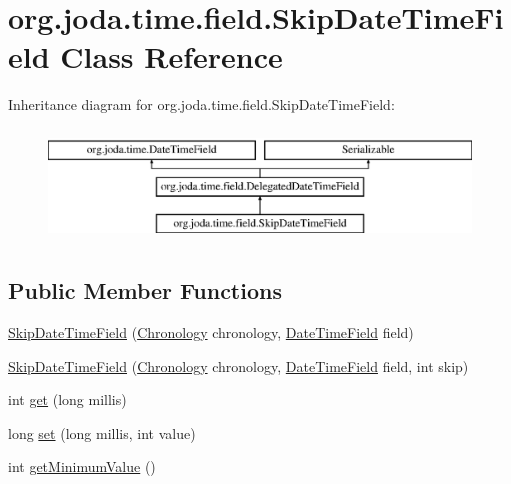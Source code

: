\hypertarget{classorg_1_1joda_1_1time_1_1field_1_1_skip_date_time_field}{\section{org.\-joda.\-time.\-field.\-Skip\-Date\-Time\-Field Class Reference}
\label{classorg_1_1joda_1_1time_1_1field_1_1_skip_date_time_field}
}
Inheritance diagram for org.\-joda.\-time.\-field.\-Skip\-Date\-Time\-Field\-:\begin{figure}[H]
\begin{center}
\leavevmode
\includegraphics[height=3.000000cm]{classorg_1_1joda_1_1time_1_1field_1_1_skip_date_time_field}
\end{center}
\end{figure}
\subsection*{Public Member Functions}
\begin{DoxyCompactItemize}
\item 
\hyperlink{classorg_1_1joda_1_1time_1_1field_1_1_skip_date_time_field_aa9891dcbec47c62f7083570c03f04257}{Skip\-Date\-Time\-Field} (\hyperlink{classorg_1_1joda_1_1time_1_1_chronology}{Chronology} chronology, \hyperlink{classorg_1_1joda_1_1time_1_1_date_time_field}{Date\-Time\-Field} field)
\item 
\hyperlink{classorg_1_1joda_1_1time_1_1field_1_1_skip_date_time_field_a8d045d4fcf9eca9bd3ccfde7c6005807}{Skip\-Date\-Time\-Field} (\hyperlink{classorg_1_1joda_1_1time_1_1_chronology}{Chronology} chronology, \hyperlink{classorg_1_1joda_1_1time_1_1_date_time_field}{Date\-Time\-Field} field, int skip)
\item 
int \hyperlink{classorg_1_1joda_1_1time_1_1field_1_1_skip_date_time_field_a1e215ec135ce0a1d107ea680b48bea77}{get} (long millis)
\item 
long \hyperlink{classorg_1_1joda_1_1time_1_1field_1_1_skip_date_time_field_ae3c99a20cba5d0e5efba6fd798f4b6cd}{set} (long millis, int value)
\item 
int \hyperlink{classorg_1_1joda_1_1time_1_1field_1_1_skip_date_time_field_a759040f8ffbc6875a0db0ff23a9a9aef}{get\-Minimum\-Value} ()
\end{DoxyCompactItemize}


